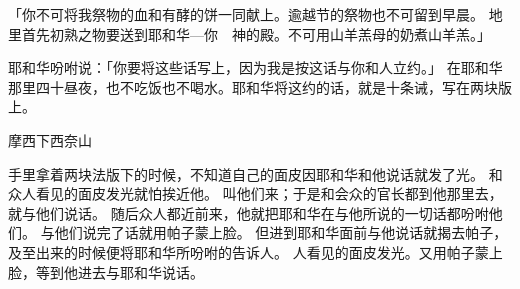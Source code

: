 {\par }{\PP {}「你不可将我祭物的血和有酵的饼一同献上。逾越节的祭物也不可留到早晨。
地里首先初熟之物要送到耶和华—你　神的殿。不可用山羊羔母的奶煮山羊羔。」
\par }{\PP {}耶和华吩咐{}说：「你要将这些话写上，因为我是按这话与你和{}人立约。」
在耶和华那里四十昼夜，也不吃饭也不喝水。耶和华将这约的话，就是十条诫，写在两块版上。
\par }{\SH 摩西下西奈山
\par }{\PP {}手里拿着两块法版下{}的时候，不知道自己的面皮因耶和华和他说话就发了光。
和{}众人看见{}的面皮发光就怕挨近他。
叫他们来；于是{}和会众的官长都到他那里去，{}就与他们说话。
随后{}众人都近前来，他就把耶和华在{}与他所说的一切话都吩咐他们。
与他们说完了话就用帕子蒙上脸。
但{}进到耶和华面前与他说话就揭去帕子，及至出来的时候便将耶和华所吩咐的告诉{}人。
人看见{}的面皮发光。{}又用帕子蒙上脸，等到他进去与耶和华说话{}。

}

